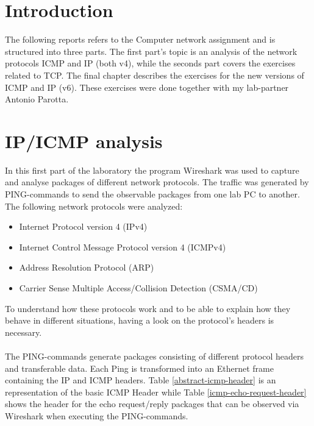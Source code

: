 \lstset{language=Java, numbers=left, numberstyle=\tiny, stepnumber=2, numbersep=5pt}
\chapter{Introduction}
\label{intro}
The following reports refers to the Computer network assignment and is structured into three parts. The first part's topic is an analysis of the network protocols ICMP and IP (both v4), while the seconds part covers the exercises related to TCP. The final chapter describes the exercises for the new versions of ICMP and IP (v6). These exercises were done together with my lab-partner Antonio Parotta.

\chapter{IP/ICMP analysis}
\label{ipv4}

In this first part of the laboratory the program Wireshark was used to capture and analyse packages of different network protocols. The traffic was generated by PING-commands to send the observable packages from one lab PC to another. The following network protocols were analyzed:
\begin{itemize}
	\item Internet Protocol version 4 (IPv4)
	\item Internet Control Message Protocol version 4 (ICMPv4)
	\item Address Resolution Protocol (ARP)
	\item Carrier Sense Multiple Access/Collision Detection (CSMA/CD)
\end{itemize}
To understand how these protocols work and to be able to explain how they behave in different situations, having a look on the protocol's headers is necessary. \\\\
The PING-commands generate packages consisting of different protocol headers and transferable data. Each Ping is transformed into an Ethernet frame containing the IP and ICMP headers. Table \ref{abstract-icmp-header} is an representation of the basic ICMP Header while Table \ref{icmp-echo-request-header} shows the header for the echo request/reply packages that can be observed via Wireshark when executing the PING-commands.

